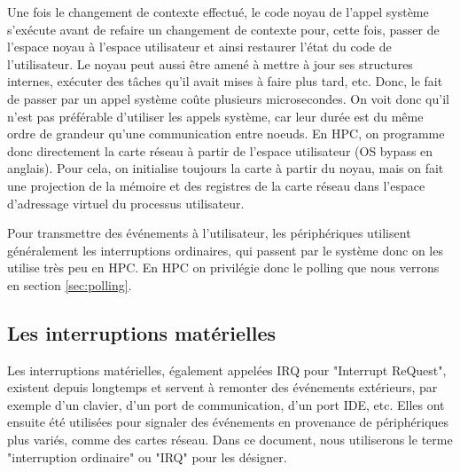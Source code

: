 

Une fois le changement de contexte effectué, le code noyau de l'appel système s'exécute avant de refaire un changement de contexte pour, cette fois, passer de l'espace noyau à l'espace utilisateur et ainsi restaurer l'état du code de l'utilisateur.
Le noyau peut aussi être amené à mettre à jour ses structures internes, exécuter des tâches qu'il avait mises à faire plus tard, etc.
Donc, le fait de passer par un appel système coûte plusieurs microsecondes.
On voit donc qu'il n'est pas préférable d'utiliser les appels système, car leur durée est du même ordre de grandeur qu'une communication entre noeuds.
En HPC, on programme donc directement la carte réseau à partir de l'espace utilisateur (OS bypass en anglais).
Pour cela, on initialise toujours la carte à partir du noyau, mais on fait une projection de la mémoire et des registres de la carte réseau dans l'espace d'adressage virtuel du processus utilisateur.

Pour transmettre des événements à l'utilisateur, les périphériques utilisent généralement les interruptions ordinaires, qui passent par le système donc on les utilise très peu en HPC.
En HPC on privilégie donc le polling que nous verrons en section \ref{sec:polling}.

\subsection{Les interruptions matérielles}

Les interruptions matérielles, également appelées IRQ pour "Interrupt ReQuest", existent depuis longtemps et
servent à remonter des événements extérieurs, par exemple d'un clavier, d'un port de communication, d'un port IDE, etc.
Elles ont ensuite été utilisées pour signaler des événements en provenance de périphériques plus variés, comme des cartes réseau.
Dans ce document, nous utiliserons le terme "interruption ordinaire" ou "IRQ" pour les désigner.


